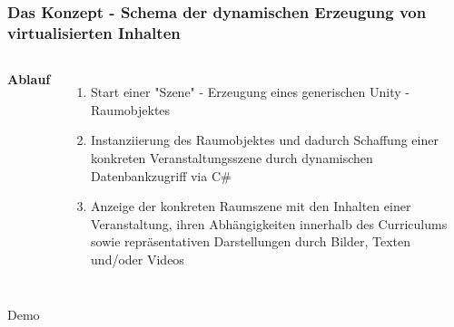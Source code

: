 \documentclass{beamer}
\begin{document}

\begin{frame}
\frametitle{Das Konzept - Schema der dynamischen Erzeugung von virtualisierten Inhalten}
\begin{adjustbox}{totalheight=\baselineskip}
\begin{columns}[c] %


\textbf{Ablauf}
\begin{enumerate}
\item Start einer "Szene" -  Erzeugung eines generischen Unity - Raumobjektes
\item Instanziierung des Raumobjektes und dadurch Schaffung einer konkreten Veranstaltungsszene durch dynamischen Datenbankzugriff via C\#
\item  Anzeige der konkreten Raumszene mit den Inhalten einer Veranstaltung, ihren Abhängigkeiten innerhalb des Curriculums sowie repräsentativen Darstellungen durch Bilder, Texten und/oder Videos
\end{enumerate}



\end{columns}
\end{adjustbox}
\end{frame}


\begin{frame}
\Huge{\centerline{Demo}}
\end{frame}
\end{document}
